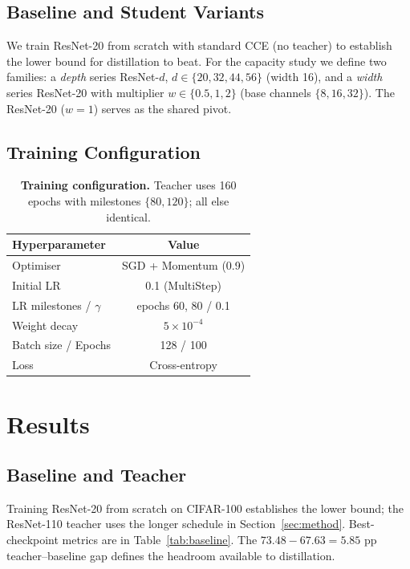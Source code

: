\documentclass{article}
\theoremstyle{plain}
\theoremstyle{definition}
\theoremstyle{remark}
\begin{document}
\subsection{Baseline and Student Variants}
\label{sec:baseline}
We train ResNet-20 from scratch with standard CCE (no teacher) to establish the lower bound for distillation to beat. For the capacity study we define two families: a \textit{depth} series ResNet-$d$, $d \in \{20, 32, 44, 56\}$ (width 16), and a \textit{width} series ResNet-20 with multiplier $w \in \{0.5, 1, 2\}$ (base channels $\{8, 16, 32\}$). The ResNet-20 ($w=1$) serves as the shared pivot.

\subsection{Training Configuration}
\label{sec:training_config}
\begin{table}[ht]
  \centering
  \caption{\textbf{Training configuration.} Teacher uses 160 epochs with milestones $\{80,120\}$; all else identical.\\}
  \label{tab:hyperparams}
  \begin{tabular}{lc}
    \toprule
    \textbf{Hyperparameter} & \textbf{Value} \\
    \midrule
    Optimiser            & SGD + Momentum (0.9) \\
    Initial LR           & 0.1 (MultiStep) \\
    LR milestones / $\gamma$ & epochs 60, 80 / 0.1 \\
    Weight decay         & $5\times10^{-4}$ \\
    Batch size / Epochs  & 128 / 100 \\
    Loss                 & Cross-entropy \\
    \bottomrule
  \end{tabular}
\end{table}

\section{Results}
\label{sec:results}

\subsection{Baseline and Teacher}
\label{sec:results_baseline_teacher}

Training ResNet-20 from scratch on CIFAR-100 establishes the lower bound; the ResNet-110 teacher uses the longer schedule in Section~\ref{sec:method}. Best-checkpoint metrics are in Table~\ref{tab:baseline}. The $73.48 - 67.63 = 5.85$ pp teacher--baseline gap defines the headroom available to distillation.
\end{document}

